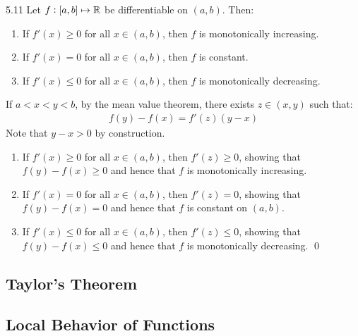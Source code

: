 \begin{theorem}{}{5.11}
    Let $f: [a, b] \mapsto \mathbb{R}$ be differentiable on $(a, b)$. Then:
    \begin{enumerate}
        \item If $f'(x) \geq 0$ for all $x \in (a, b)$, then $f$ is monotonically increasing.
        \item If $f'(x) = 0$ for all $x \in (a, b)$, then $f$ is constant. 
        \item If $f'(x) \leq 0$ for all $x \in (a, b)$, then $f$ is monotonically decreasing.
    \end{enumerate} 
\end{theorem}
\begin{nproof}
    If $a < x < y < b$, by the mean value theorem, there exists $z \in (x, y)$ such that:
    \begin{align*}
        f(y) - f(x) = f'(z)(y - x)
    \end{align*}
    Note that $y - x > 0$ by construction. 
    \begin{enumerate}
        \item If $f'(x) \geq 0$ for all $x \in (a, b)$, then $f'(z) \geq 0$, showing that $f(y) - f(x) \geq 0$ and hence that $f$ is monotonically increasing. 
        \item If $f'(x) = 0$ for all $x \in (a, b)$, then $f'(z) = 0$, showing that $f(y) - f(x) = 0$ and hence that $f$ is constant on $(a, b)$.
        \item If $f'(x) \leq 0$ for all $x \in (a, b)$, then $f'(z) \leq 0$, showing that $f(y) - f(x) \leq 0$ and hence that $f$ is monotonically decreasing. \qed
    \end{enumerate}
    
\end{nproof}

\subsection{Taylor's Theorem}

\subsection{Local Behavior of Functions}